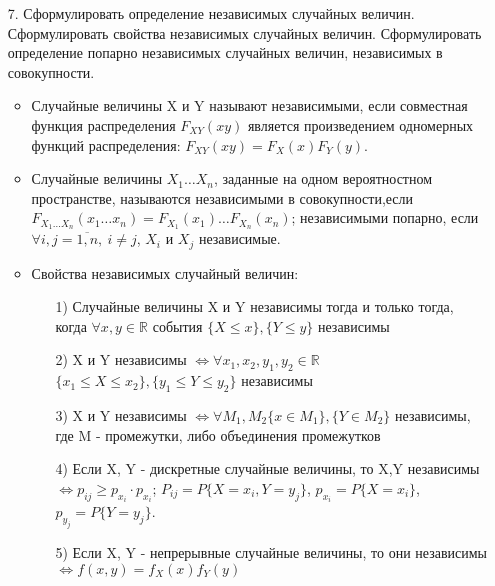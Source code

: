 \documentclass[a4paper]{article}
\begin{document}
\begin{enumerate}
\item[7.] Сформулировать определение независимых случайных величин. Сформулировать свойства независимых случайных величин. Сформулировать определение попарно независимых случайных величин, независимых в совокупности. \\
\begin{itemize}
\item Случайные величины X и Y называют независимыми, если совместная функция распределения $F_{XY}(xy)$ является произведением одномерных функций распределения: $F_{XY} (xy) = F_X(x) F_Y(y)$.
\item Случайные величины $X_1 \ldots X_n$, заданные на одном вероятностном пространстве, называются независимыми в совокупности,если $F_{X_1 \ldots X_n} (x_1 \ldots x_n) = F_{X_1}(x_1) \ldots F_{X_n}(x_n)$; независимыми попарно, если $\forall i,j = \overline{1,n}, \ i \neq j$, $X_i$ и $X_j$ независимые.
\item Свойства независимых случайный величин: 
	\begin{enumerate}
	\item[1)] Случайные величины X и Y независимы тогда и только тогда, когда $\forall x,y \in \mathbb{R}$ события $\{X \leqslant x\}, \{Y \leqslant y\}$ независимы
	\item[2)] X и Y независимы $\Leftrightarrow \forall x_1, x_2, y_1, y_2 \in \mathbb{R}$ $\{x_1 \leqslant X \leqslant x_2\}, \{y_1 \leqslant Y \leqslant y_2\}$ независимы
	\item[3)] X и Y независимы $\Leftrightarrow \forall M_1, M_2 \{x \in M_1\}, \{Y \in M_2\}$ независимы, где M - промежутки, либо объединения промежутков
	\item[4)] Если X, Y - дискретные случайные величины, то X,Y независимы $\Leftrightarrow p_{ij} \geqslant p_{x_i} \cdot p_{x_i}$; $P_{ij} = P\{X = x_i, Y = y_j\}$, $p_{x_i} = P\{X = x_i\}$, $p_{y_j} = P\{Y = y_j\}$.
	\item[5)] Если X, Y - непрерывные случайные величины, то они независимы $\Leftrightarrow f(x,y) = f_X(x) f_Y(y)$
	\end{enumerate}
\end{itemize}



\end{enumerate}
\end{document}
